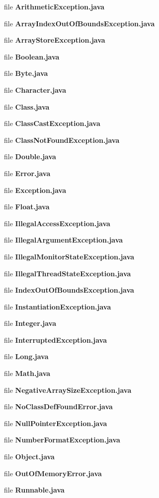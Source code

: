 \begin{DoxyCompactItemize}
\item 
file {\bfseries ArithmeticException.java}
\item 
file {\bfseries ArrayIndexOutOfBoundsException.java}
\item 
file {\bfseries ArrayStoreException.java}
\item 
file {\bfseries Boolean.java}
\item 
file {\bfseries Byte.java}
\item 
file {\bfseries Character.java}
\item 
file {\bfseries Class.java}
\item 
file {\bfseries ClassCastException.java}
\item 
file {\bfseries ClassNotFoundException.java}
\item 
file {\bfseries Double.java}
\item 
file {\bfseries Error.java}
\item 
file {\bfseries Exception.java}
\item 
file {\bfseries Float.java}
\item 
file {\bfseries IllegalAccessException.java}
\item 
file {\bfseries IllegalArgumentException.java}
\item 
file {\bfseries IllegalMonitorStateException.java}
\item 
file {\bfseries IllegalThreadStateException.java}
\item 
file {\bfseries IndexOutOfBoundsException.java}
\item 
file {\bfseries InstantiationException.java}
\item 
file {\bfseries Integer.java}
\item 
file {\bfseries InterruptedException.java}
\item 
file {\bfseries Long.java}
\item 
file {\bfseries Math.java}
\item 
file {\bfseries NegativeArraySizeException.java}
\item 
file {\bfseries NoClassDefFoundError.java}
\item 
file {\bfseries NullPointerException.java}
\item 
file {\bfseries NumberFormatException.java}
\item 
file {\bfseries Object.java}
\item 
file {\bfseries OutOfMemoryError.java}
\item 
file {\bfseries Runnable.java}

\end{DoxyCompactItemize}
